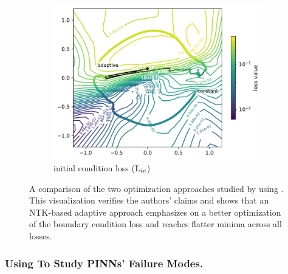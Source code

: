 \documentclass[letterpaper]{article} %
\begin{document}
\begin{figure}[htb]
\begin{subfigure}[b]{0.3\textwidth}
            \end{subfigure}
            \hfill
            \begin{subfigure}[b]{0.3\textwidth}
                \centering
                \includegraphics[width=\textwidth]{figures/round3/NTK/map_ic_train_loss_loss.pdf}
                \caption{initial condition loss ($\text{L}_{ic}$)}
            \end{subfigure}
            
            \caption{A comparison of the two optimization approaches studied by \cite{wang2020and} using \proposedautencoder{}. This visualization verifies the authors' claims and shows that an NTK-based adaptive approach emphasizes on a better optimization of the boundary condition loss and reaches flatter minima across all losses.}
            \label{fig:PINNsNTK}
        \end{figure}







           \subsubsection{Using \proposedautencoder{} To Study PINNs' Failure Modes.} \label{se:mahoney}
\end{document}
